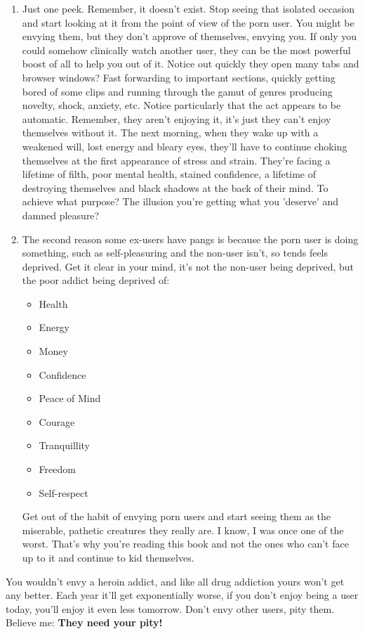 \documentclass[easypeasy.tex]{subfiles}
\begin{document}
\begin{enumerate}
  \item Just one peek. Remember, it doesn't exist. Stop seeing that isolated occasion and start looking at it from the point of view of the porn user. You might be envying them, but they don't approve of themselves, envying you. If only you could somehow clinically watch another user, they can be the most powerful boost of all to help you out of it. Notice out quickly they open many tabs and browser windows? Fast forwarding to important sections, quickly getting bored of some clips and running through the gamut of genres producing novelty, shock, anxiety, etc. Notice particularly that the act appears to be automatic. Remember, they aren't enjoying it, it's just they can't enjoy themselves without it. The next morning, when they wake up with a weakened will, lost energy and bleary eyes, they'll have to continue choking themselves at the first appearance of stress and strain. They're facing a lifetime of filth, poor mental health, stained confidence, a lifetime of destroying themselves and black shadows at the back of their mind. To achieve what purpose? The illusion you're getting what you 'deserve' and damned pleasure?

  \item The second reason some ex-users have pangs is because the porn user is doing something, such as self-pleasuring and the non-user isn't, so tends feels deprived. Get it clear in your mind, it's not the non-user being deprived, but the poor addict being deprived of:
  \begin{itemize}
    \item Health
    \item Energy
    \item Money
    \item Confidence
    \item Peace of Mind
    \item Courage
    \item Tranquillity
    \item Freedom
    \item Self-respect
  \end{itemize}

  Get out of the habit of envying porn users and start seeing them as the miserable, pathetic creatures they really are. I know, I was once one of the worst. That's why you're reading this book and not the ones who can't face up to it and continue to kid themselves.
\end{enumerate}

  You wouldn't envy a heroin addict, and like all drug addiction yours won't get any better. Each year it'll get exponentially worse, if you don't enjoy being a user today, you'll enjoy it even less tomorrow. Don't envy other users, pity them. Believe me: \textbf{They need your pity!}
\end{document}
